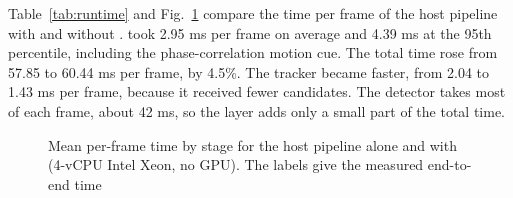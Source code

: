 Table~\ref{tab:runtime} and Fig.~\ref{fig:runtime} compare the time per frame
of the host pipeline with and without \scl{}. \scl{} took 2.95 ms per
frame on average and 4.39 ms at the 95th percentile, including the
phase-correlation motion cue. The total time rose from 57.85 to 60.44 ms
per frame, by 4.5\%. The tracker became faster, from 2.04 to 1.43 ms per
frame, because it received fewer candidates. The detector takes most of each
frame, about 42 ms, so the layer adds only a small part of the total time.



\begin{figure}[t]
\centering

\caption{Mean per-frame time by stage for the host pipeline alone and with
\scl{} (4-vCPU Intel Xeon, no GPU). The labels give the measured
end-to-end time}
\label{fig:runtime}
\end{figure}
